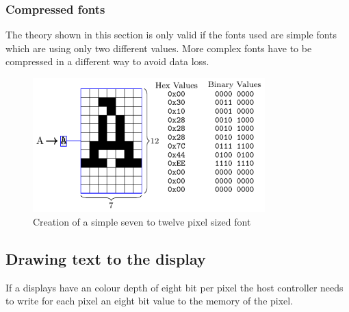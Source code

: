 \subsubsection{Compressed fonts}\label{theory:CompressedFonts}

The theory shown in this section is only valid if the fonts used are simple fonts which are using only two different values. More complex fonts have to be compressed in a different way to avoid data loss. 
\begin{figure}[H]
	\centering
	\includegraphics[width=0.8\textwidth]{2-theory/drawing-graphics/graphics/font12.pdf}
	\caption{Creation of a simple seven to twelve pixel sized font\label{theory:font12}}
\end{figure}



\subsection{Drawing text to the display}

If a displays have an colour depth of eight bit per pixel the host controller needs to write for each pixel an eight bit value to the memory of the pixel. 


